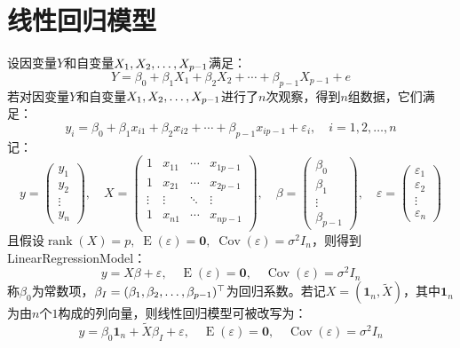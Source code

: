\section{线性回归模型}
\begin{definition}\label{model:LinearRegressionModel}
	设因变量$Y$和自变量$X_1, X_2, \dots, X_{p-1}$满足：
	\begin{equation*}
		Y=\beta_0+\beta_1X_1+\beta_2X_2+\cdots+\beta_{p-1}X_{p-1}+e
	\end{equation*}
	若对因变量$Y$和自变量$X_1, X_2, \dots, X_{p-1}$进行了$n$次观察，得到$n$组数据，它们满足：
	\begin{equation*}
		y_i=\beta_0+\beta_1x_{i1}+\beta_2x_{i2}+\cdots+\beta_{p-1}x_{ip-1}+\varepsilon_i,\quad i=1,2,\dots,n
	\end{equation*}
	记：
	\begin{equation*}
		y=
		\begin{pmatrix}
			y_1 \\
			y_2 \\
			\vdots \\
			y_n
		\end{pmatrix},\quad
		X=
		\begin{pmatrix}
			1 & x_{11} & \cdots & x_{1p-1} \\
			1 & x_{21} & \cdots & x_{2p-1} \\
			\vdots & \vdots & \ddots & \vdots \\
			1 & x_{n1} & \cdots & x_{np-1} \\
		\end{pmatrix},\quad
		\beta=
		\begin{pmatrix}
			\beta_0 \\
			\beta_1 \\
			\vdots \\
			\beta_{p-1}
		\end{pmatrix},\quad
		\varepsilon=
		\begin{pmatrix}
			\varepsilon_1 \\
			\varepsilon_2 \\
			\vdots \\
			\varepsilon_n
		\end{pmatrix}
	\end{equation*}
	且假设$\operatorname{rank}(X)=p,\;\operatorname{E}(\varepsilon)=\mathbf{0},\;\operatorname{Cov}(\varepsilon)=\sigma^2I_n$，则得到\gls{LinearRegressionModel}：
	\begin{equation*}
		y=X\beta+\varepsilon,\quad\operatorname{E}(\varepsilon)=\mathbf{0},\quad\operatorname{Cov}(\varepsilon)=\sigma^2I_n
	\end{equation*}
	称$\beta_0$为常数项，$\beta_I=(\beta_1, \beta_2, \dots, \beta_{p-1})^{\top}$为回归系数。若记$X=(\mathbf{1}_n,\tilde{X})$，其中$\mathbf{1}_n$为由$n$个$1$构成的列向量，则线性回归模型可被改写为：
	\begin{equation*}
		y=\beta_0\mathbf{1}_n+\tilde{X}\beta_I+\varepsilon,\quad\operatorname{E}(\varepsilon)=\mathbf{0},\quad\operatorname{Cov}(\varepsilon)=\sigma^2I_n
	\end{equation*}
\end{definition}

